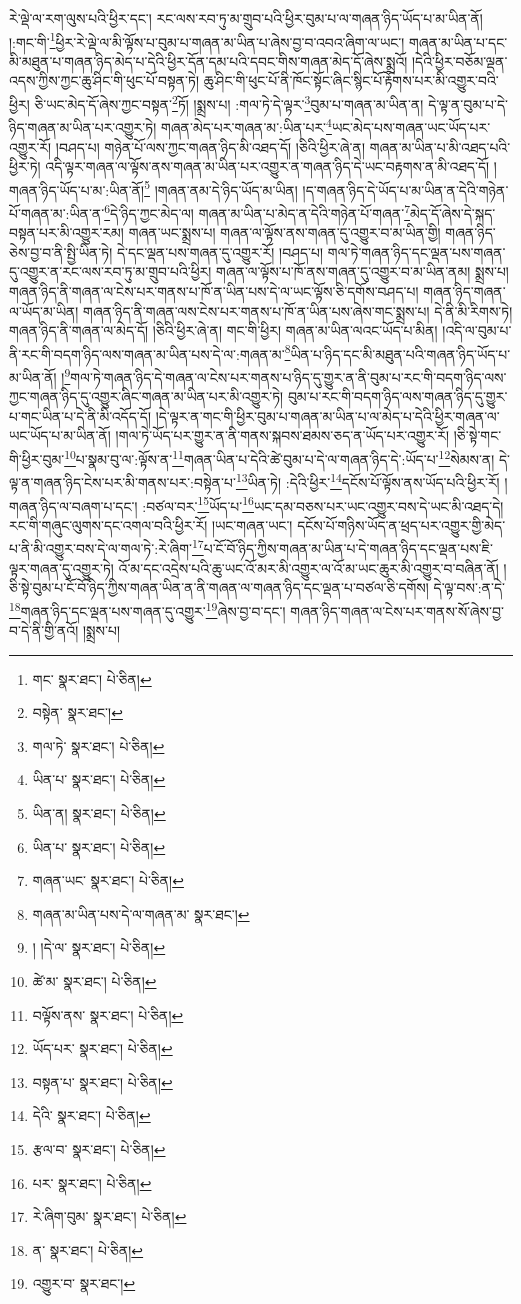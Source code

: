 རེ་ལྡེ་ལ་རག་ལུས་པའི་ཕྱིར་དང་། རང་ལས་རབ་ཏུ་མ་གྲུབ་པའི་ཕྱིར་བུམ་པ་ལ་གཞན་ཉིད་ཡོད་པ་མ་ཡིན་ནོ། །:གང་གི་\footnote{གང་  སྣར་ཐང་།  པེ་ཅིན། }ཕྱིར་རེ་ལྡེ་ལ་མི་ལྟོས་པ་བུམ་པ་གཞན་མ་ཡིན་པ་ཞེས་བྱ་བ་འབའ་ཞིག་ལ་ཡང་། གཞན་མ་ཡིན་པ་དང་མི་མཐུན་པ་གཞན་ཉིད་མེད་པ་དེའི་ཕྱིར་དོན་དམ་པའི་དབང་གིས་གཞན་མེད་དོ་ཞེས་སྨྲའོ། །དེའི་ཕྱིར་བཅོམ་ལྡན་འདས་ཀྱིས་ཀྱང་ཆུ་ཤིང་གི་ཕུང་པོ་བསྟན་ཏེ། ཆུ་ཤིང་གི་ཕུང་པོ་ནི་ཁོང་སྟོང་ཞིང་སྙིང་པོ་རྟོགས་པར་མི་འགྱུར་བའི་ཕྱིར། ཅི་ཡང་མེད་དོ་ཞེས་ཀྱང་བསྟན་\footnote{བསྟེན་  སྣར་ཐང་། }ཏོ། །སྨྲས་པ། :གལ་ཏེ་དེ་ལྟར་\footnote{གལ་ཏེ་  སྣར་ཐང་།  པེ་ཅིན། }བུམ་པ་གཞན་མ་ཡིན་ན། དེ་ལྟ་ན་བུམ་པ་དེ་ཉིད་གཞན་མ་ཡིན་པར་འགྱུར་ཏེ། གཞན་མེད་པར་གཞན་མ་:ཡིན་པར་\footnote{ཡིན་པ་  སྣར་ཐང་།  པེ་ཅིན། }ཡང་མེད་པས་གཞན་ཡང་ཡོད་པར་འགྱུར་རོ། །བཤད་པ། གཉེན་པོ་ལས་ཀྱང་གཞན་ཉིད་མི་འཐད་དོ། །ཅིའི་ཕྱིར་ཞེ་ན། གཞན་མ་ཡིན་པ་མི་འཐད་པའི་ཕྱིར་ཏེ། འདི་ལྟར་གཞན་ལ་ལྟོས་ནས་གཞན་མ་ཡིན་པར་འགྱུར་ན་གཞན་ཉིད་དེ་ཡང་བརྟགས་ན་མི་འཐད་དོ། །གཞན་ཉིད་ཡོད་པ་མ་:ཡིན་ནོ།\footnote{ཡིན་ན།  སྣར་ཐང་།  པེ་ཅིན། } །གཞན་ནམ་དེ་ཉིད་ཡོད་མ་ཡིན། །ད་གཞན་ཉིད་དེ་ཡོད་པ་མ་ཡིན་ན་དེའི་གཉེན་པོ་གཞན་མ་:ཡིན་ན་\footnote{ཡིན་པ་  སྣར་ཐང་།  པེ་ཅིན། }དེ་ཉིད་ཀྱང་མེད་ལ། གཞན་མ་ཡིན་པ་མེད་ན་དེའི་གཉེན་པོ་གཞན་\footnote{གཞན་ཡང་  སྣར་ཐང་།  པེ་ཅིན། }མེད་དོ་ཞེས་དེ་སྐད་བསྟན་པར་མི་འགྱུར་རམ། གཞན་ཡང་སྨྲས་པ། གཞན་ལ་ལྟོས་ནས་གཞན་དུ་འགྱུར་བ་མ་ཡིན་གྱི། གཞན་ཉིད་ཅེས་བྱ་བ་ནི་སྤྱི་ཡིན་ཏེ། དེ་དང་ལྡན་པས་གཞན་དུ་འགྱུར་རོ། །བཤད་པ། གལ་ཏེ་གཞན་ཉིད་དང་ལྡན་པས་གཞན་དུ་འགྱུར་ན་རང་ལས་རབ་ཏུ་མ་གྲུབ་པའི་ཕྱིར། གཞན་ལ་ལྟོས་པ་ཁོ་ནས་གཞན་དུ་འགྱུར་བ་མ་ཡིན་ནམ། སྨྲས་པ། གཞན་ཉིད་ནི་གཞན་ལ་ངེས་པར་གནས་པ་ཁོ་ན་ཡིན་པས་དེ་ལ་ཡང་ལྟོས་ཅི་དགོས་བཤད་པ། གཞན་ཉིད་གཞན་ལ་ཡོད་མ་ཡིན། གཞན་ཉིད་ནི་གཞན་ལས་ངེས་པར་གནས་པ་ཁོ་ན་ཡིན་པས་ཞེས་གང་སྨྲས་པ། དེ་ནི་མི་རིགས་ཏེ། གཞན་ཉིད་ནི་གཞན་ལ་མེད་དོ། །ཅིའི་ཕྱིར་ཞེ་ན། གང་གི་ཕྱིར། གཞན་མ་ཡིན་ལའང་ཡོད་པ་མིན། །འདི་ལ་བུམ་པ་ནི་རང་གི་བདག་ཉིད་ལས་གཞན་མ་ཡིན་པས་དེ་ལ་:གཞན་མ་\footnote{གཞན་མ་ཡིན་པས་དེ་ལ་གཞན་མ་  སྣར་ཐང་། }ཡིན་པ་ཉིད་དང་མི་མཐུན་པའི་གཞན་ཉིད་ཡོད་པ་མ་ཡིན་ནོ། །\footnote{། །དེ་ལ་  སྣར་ཐང་།  པེ་ཅིན། }གལ་ཏེ་གཞན་ཉིད་དེ་གཞན་ལ་ངེས་པར་གནས་པ་ཉིད་དུ་གྱུར་ན་ནི་བུམ་པ་རང་གི་བདག་ཉིད་ལས་ཀྱང་གཞན་ཉིད་དུ་འགྱུར་ཞིང་གཞན་མ་ཡིན་པར་མི་འགྱུར་ཏེ། བུམ་པ་རང་གི་བདག་ཉིད་ལས་གཞན་ཉིད་དུ་གྱུར་པ་གང་ཡིན་པ་དེ་ནི་མི་འདོད་དོ། །དེ་ལྟར་ན་གང་གི་ཕྱིར་བུམ་པ་གཞན་མ་ཡིན་པ་ལ་མེད་པ་དེའི་ཕྱིར་གཞན་ལ་ཡང་ཡོད་པ་མ་ཡིན་ནོ། །གལ་ཏེ་ཡོད་པར་གྱུར་ན་ནི་གནས་སྐབས་ཐམས་ཅད་ན་ཡོད་པར་འགྱུར་རོ། །ཅི་སྟེ་གང་གི་ཕྱིར་བུམ་\footnote{ཚེ་མ་  སྣར་ཐང་།  པེ་ཅིན། }པ་སྣམ་བུ་ལ་:ལྟོས་ན་\footnote{བལྟོས་ནས་  སྣར་ཐང་།  པེ་ཅིན། }གཞན་ཡིན་པ་དེའི་ཚེ་བུམ་པ་དེ་ལ་གཞན་ཉིད་དེ་:ཡོད་པ་\footnote{ཡོད་པར་  སྣར་ཐང་།  པེ་ཅིན། }སེམས་ན། དེ་ལྟ་ན་གཞན་ཉིད་ངེས་པར་མི་གནས་པར་:བསྟེན་པ་\footnote{བསྟན་པ་  སྣར་ཐང་།  པེ་ཅིན། }ཡིན་ཏེ། :དེའི་ཕྱིར་\footnote{དེའི་  སྣར་ཐང་།  པེ་ཅིན། }དངོས་པོ་ལྟོས་ནས་ཡོད་པའི་ཕྱིར་རོ། །གཞན་ཉིད་ལ་བཞག་པ་དང་། :བཙལ་བར་\footnote{རྩལ་བ་  སྣར་ཐང་།  པེ་ཅིན། }ཡོད་པ་\footnote{པར་  སྣར་ཐང་།  པེ་ཅིན། }ཡང་དམ་བཅས་པར་ཡང་འགྱུར་བས་དེ་ཡང་མི་འཐད་དེ། རང་གི་གཞུང་ལུགས་དང་འགལ་བའི་ཕྱིར་རོ། །ཡང་གཞན་ཡང་། དངོས་པོ་གཉིས་ཡོད་ན་ཕྲད་པར་འགྱུར་གྱི་མེད་པ་ནི་མི་འགྱུར་བས་དེ་ལ་གལ་ཏེ་:རེ་ཞིག་\footnote{རེ་ཞིག་བུམ་  སྣར་ཐང་།  པེ་ཅིན། }པ་ངོ་བོ་ཉིད་ཀྱིས་གཞན་མ་ཡིན་པ་དེ་གཞན་ཉིད་དང་ལྡན་པས་ཇི་ལྟར་གཞན་དུ་འགྱུར་ཏེ། འོ་མ་དང་འདྲེས་པའི་ཆུ་ཡང་འོ་མར་མི་འགྱུར་ལ་འོ་མ་ཡང་ཆུར་མི་འགྱུར་བ་བཞིན་ནོ། །ཅི་སྟེ་བུམ་པ་ངོ་བོ་ཉིད་ཀྱིས་གཞན་ཡིན་ན་ནི་གཞན་ལ་གཞན་ཉིད་དང་ལྡན་པ་བཙལ་ཅི་དགོས། དེ་ལྟ་བས་:ན་དེ་\footnote{ན་  སྣར་ཐང་།  པེ་ཅིན། }གཞན་ཉིད་དང་ལྡན་པས་གཞན་དུ་འགྱུར་\footnote{འགྱུར་བ་  སྣར་ཐང་། }ཞེས་བྱ་བ་དང་། གཞན་ཉིད་གཞན་ལ་ངེས་པར་གནས་སོ་ཞེས་བྱ་བ་དེ་ནི་གྱི་ནའོ། །སྨྲས་པ། 